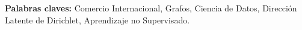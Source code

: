 \chapter*{\runtitulo}

\noindent


\bigskip

\noindent\textbf{Palabras claves:} Comercio Internacional, Grafos, Ciencia de Datos, Dirección Latente de Dirichlet, Aprendizaje no Supervisado.